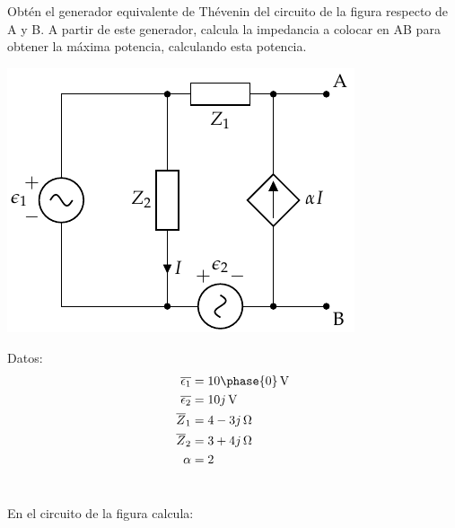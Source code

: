 \documentclass[12pt]{article}
\begin{document}
\section{}

Obtén el generador equivalente de Thévenin del circuito de la figura respecto de A y B. A partir de este generador, calcula la impedancia a colocar en AB para obtener la máxima potencia, calculando esta potencia.

\begin{center}
\includegraphics{figs/Thevenin5}
\end{center}

Datos:
\begin{align*}
  \overline{\epsilon_1} &= \SI[parse-numbers=false]{10\phase{0}}{\volt}\\
  \overline{\epsilon_2} &= \SI[parse-numbers=false]{10j}{\volt}\\
  \overline{Z}_1 &= \SI[parse-numbers=false]{4 - 3j}{\ohm}\\
  \overline{Z}_2 &= \SI[parse-numbers=false]{3 + 4j}{\ohm}\\
  \alpha &= 2
\end{align*}

\noindent\hrulefill

\clearpage

\section{}

En el circuito de la figura calcula:
\end{document}
